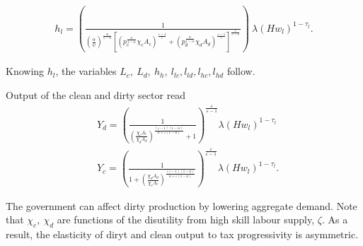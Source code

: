 \begin{align*}
h_l=\left( \frac{1}{\left(\frac{\alpha}{\psi}\right)^{\frac{\alpha}{1-\alpha}}\left[\left(p_c^\frac{\alpha}{1-\alpha}\chi_c A_c\right)^\frac{\varepsilon-1}{\varepsilon}+\left(p_d^\frac{\alpha}{1-\alpha}\chi_d A_d\right)^\frac{\varepsilon-1}{\varepsilon}\right]^\frac{\varepsilon}{\varepsilon-1}}\right)\ \lambda \left(H w_l\right)^{1-\tau_l}.
\end{align*}

Knowing $h_l$, the variables $L_c, \ L_d, \ h_h, \ l_{lc}, l_{ld}, l_{hc}, l_{hd}$ follow. 

Output of the clean and dirty sector read
\begin{align}
&Y_d = \left(\frac{1}{\left(\frac{\chi_c A_c}{\chi_d A_d}\right)^{\frac{(\varepsilon-1)(1-\alpha)}{\alpha+\varepsilon(1-\alpha)}}+1}\right)^\frac{\varepsilon}{\varepsilon-1}\lambda (H w_l)^{1-\tau_l}\\
& Y_c= \left(\frac{1}{1+\left(\frac{\chi_d A_d}{\chi_c A_c}\right)^{\frac{(\varepsilon-1)(1-\alpha)}{\alpha+\varepsilon(1-\alpha)}}}\right)^\frac{\varepsilon}{\varepsilon-1}\lambda (H w_l)^{1-\tau_l}.
\end{align}

The government can affect dirty production by lowering aggregate demand. Note that $\chi_c,\ \chi_d$ are functions of the disutility from high skill labour supply, $\zeta$. As a result, the elasticity of diryt and clean output to tax progressivity is asymmetric.